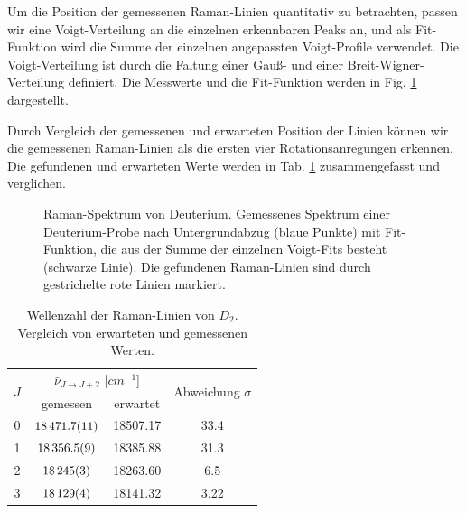 \documentclass[11pt]{article}
\begin{document}
Um die Position der gemessenen Raman-Linien quantitativ zu betrachten, passen wir eine Voigt-Verteilung an die einzelnen erkennbaren Peaks an, und als Fit-Funktion wird die Summe der einzelnen angepassten Voigt-Profile verwendet. Die Voigt-Verteilung ist durch die Faltung einer Gauß- und einer Breit-Wigner-Verteilung definiert. Die Messwerte und die Fit-Funktion werden in Fig. \ref{fig:Deuterium} dargestellt. 

Durch Vergleich der gemessenen und erwarteten Position der Linien können wir die gemessenen Raman-Linien als die ersten vier Rotationsanregungen erkennen. Die gefundenen und erwarteten Werte werden in Tab. \ref{tab:D2} zusammengefasst und verglichen.

\begin{figure}[htbp]
	\centering
   \caption{\small Raman-Spektrum von Deuterium. Gemessenes Spektrum einer Deuterium-Probe nach Untergrundabzug (blaue Punkte) mit Fit-Funktion, die aus der Summe der einzelnen Voigt-Fits besteht (schwarze Linie). Die gefundenen Raman-Linien sind durch gestrichelte rote Linien markiert.}
   \label{fig:Deuterium}
\end{figure}

\begin{table}[!htbp]
 \begin{center}
  \caption{\small Wellenzahl der Raman-Linien von $D_2$. Vergleich von erwarteten und gemessenen Werten.}
   \renewcommand{\arraystretch}{1.3} %
  \label{tab:D2}
  \begin{tabular}{|c|c|c|c|}
  \hline
\multirow{2}{*}{$J$}& \multicolumn{2}{c|}{$\bar{\nu}_{J\to J+2}$ [$\unit{cm^{-1}}$]} &  \multirow{2}{*}{ Abweichung $\sigma$} \\ \cline{2-3} %
 					 & gemessen & erwartet &    			\\ 
  \hline
	\hline 
0 & $\num{18471.7\pm 1.1}$	& 18507.17	& 33.4 \\
1 & $\num{18356.5	\pm 0.9}$	& 18385.88	& 31.3 \\
2 & $\num{18245\pm 3}$	& 18263.60	& 6.5	 \\
3 & $\num{18129\pm 4}$	& 18141.32	& 3.22 \\
	\hline
  \end{tabular}
  \renewcommand{\arraystretch}{1} 

 \end{center}
\end{table}
\end{document}
